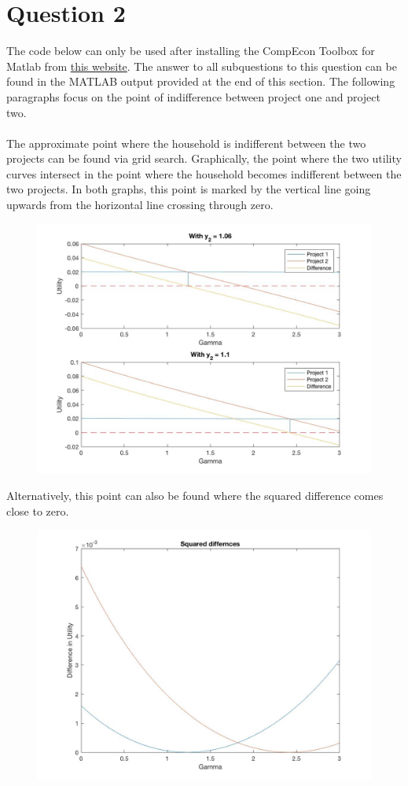 \documentclass{article}
\begin{document}
	\section{Question 2}
	The code below can only be used after installing the CompEcon Toolbox for Matlab from \href{http://www4.ncsu.edu/~pfackler/compecon/toolbox.html}{this website}.
	The answer to all subquestions to this question can be found in the MATLAB output provided at the end of this section. The following paragraphs focus on the point of indifference between project one and project two.\\ \\
	The approximate point where the household is indifferent between the two projects can be found via grid search. Graphically, the point where the two utility curves intersect in the point where the household becomes indifferent between the two projects. In both graphs, this point is marked by the vertical line going upwards from the horizontal line crossing through zero.
	\begin{figure}[H]
		\includegraphics[width = \textwidth, keepaspectratio]{PS5Q2Sub3_Utility.jpg} 
	\end{figure}
\noindent Alternatively, this point can also be found where the squared difference comes close to zero. \begin{figure}[H]
		\includegraphics[width = \textwidth, keepaspectratio]{PS5Q2Sub3_Squared_Diff.jpg}
	\end{figure}
\end{document}
